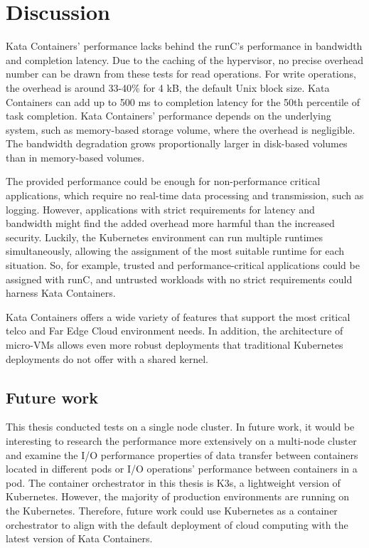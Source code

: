 \chapter{Discussion}
\label{chapter:discussion}

Kata Containers' performance lacks behind the runC's performance in bandwidth and completion latency. Due to the caching of the hypervisor, no precise overhead number can be drawn from these tests for read operations. For write operations, the overhead is around 33-40\% for 4 kB, the default Unix block size. Kata Containers can add up to 500 ms to completion latency for the 50th percentile of task completion. Kata Containers' performance depends on the underlying system, such as memory-based storage volume, where the overhead is negligible. The bandwidth degradation grows proportionally larger in disk-based volumes than in memory-based volumes.

The provided performance could be enough for non-performance critical applications, which require no real-time data processing and transmission, such as logging. However, applications with strict requirements for latency and bandwidth might find the added overhead more harmful than the increased security. Luckily, the Kubernetes environment can run multiple runtimes simultaneously, allowing the assignment of the most suitable runtime for each situation. So, for example, trusted and performance-critical applications could be assigned with runC, and untrusted workloads with no strict requirements could harness Kata Containers.

Kata Containers offers a wide variety of features that support the most critical telco and Far Edge Cloud environment needs. In addition, the architecture of micro-VMs allows even more robust deployments that traditional Kubernetes deployments do not offer with a shared kernel.

\section{Future work}

This thesis conducted tests on a single node cluster. In future work, it would be interesting to research the performance more extensively on a multi-node cluster and examine the I/O performance properties of data transfer between containers located in different pods or I/O operations' performance between containers in a pod. The container orchestrator in this thesis is K3s, a lightweight version of Kubernetes. However, the majority of production environments are running on the Kubernetes. Therefore, future work could use Kubernetes as a container orchestrator to align with the default deployment of cloud computing with the latest version of Kata Containers.

